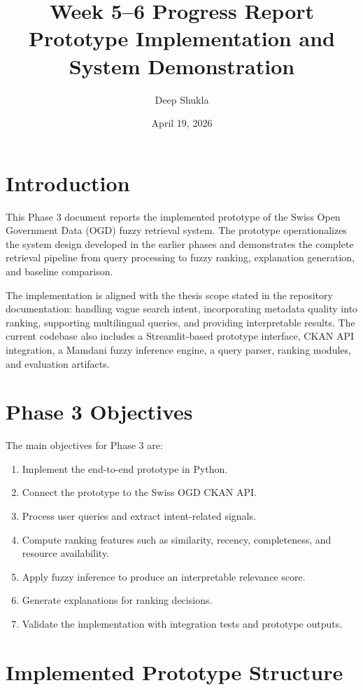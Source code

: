\documentclass[11pt,a4paper]{article}
\title{Week 5--6 Progress Report\\Prototype Implementation and System Demonstration}
\author{Deep Shukla}
\date{April 19, 2026}
\begin{document}
\maketitle

\section{Introduction}

This Phase 3 document reports the implemented prototype of the Swiss Open Government Data (OGD) fuzzy retrieval system. The prototype operationalizes the system design developed in the earlier phases and demonstrates the complete retrieval pipeline from query processing to fuzzy ranking, explanation generation, and baseline comparison.

The implementation is aligned with the thesis scope stated in the repository documentation: handling vague search intent, incorporating metadata quality into ranking, supporting multilingual queries, and providing interpretable results. The current codebase also includes a Streamlit-based prototype interface, CKAN API integration, a Mamdani fuzzy inference engine, a query parser, ranking modules, and evaluation artifacts.

\section{Phase 3 Objectives}

The main objectives for Phase 3 are:
\begin{enumerate}[leftmargin=1.5em]
  \item Implement the end-to-end prototype in Python.
  \item Connect the prototype to the Swiss OGD CKAN API.
  \item Process user queries and extract intent-related signals.
  \item Compute ranking features such as similarity, recency, completeness, and resource availability.
  \item Apply fuzzy inference to produce an interpretable relevance score.
  \item Generate explanations for ranking decisions.
  \item Validate the implementation with integration tests and prototype outputs.
\end{enumerate}

\section{Implemented Prototype Structure}
\end{document}
